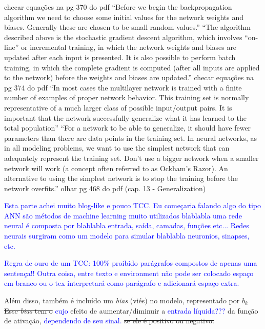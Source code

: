 \documentclass{automatextcc}
\newcommand{\pumi}[1]{\textcolor{blue}{#1}}
\begin{document}
checar equações na pg 370 do pdf
``Before we begin the backpropagation algorithm we need to choose some initial values for the network weights and biases. Generally these are chosen to be small random values.''
``The algorithm described above is the stochastic gradient descent algorithm, which involves “on-line” or incremental training, in which the network weights and biases are updated after each input is presented. It is also possible to perform batch training, in which the complete gradient is computed (after all inputs are applied to the network) before the weights and biases are updated.''
checar equações na pg 374 do pdf
``In most cases the multilayer network is trained with a finite number of examples of proper network behavior. This training set is normally representative of a much larger class of possible input/output pairs. It is important that the network successfully generalize what it has learned to the total population''
``For a network to be able to generalize, it should have fewer parameters than there are data points in the training set. In neural networks, as in all modeling problems, we want to use the simplest network that can adequately represent the training set. Don’t use a bigger network when a smaller network will work (a concept often referred to as Ockham’s Razor). An alternative to using the simplest network is to stop the training before
the network overfits.''
olhar pg 468 do pdf (cap. 13 - Generalization)



\vspace{3cm}
\pumi{Esta parte achei muito blog-like e pouco TCC. Eu começaria falando algo do tipo ANN são métodos de machine learning muito utilizados blablabla uma rede neural é composta por blablabla entrada, saída, camadas, funções etc... Redes neurais surgiram como um modelo para simular blablabla neuronios, sinapses, etc. }    


\pumi{Regra de ouro de um TCC: 100\% proibido parágrafos compostos de apenas uma sentença!! Outra coisa, entre texto e environment não pode ser colocado espaço em branco ou o tex interpretará como parágrafo e adicionará espaço extra.}

Além disso, também é incluído um \textit{bias} (viés) no modelo, representado por $b_k$ \sout{ Esse \textit{bias} tem o} \pumi{cujo} efeito de aumentar/diminuir a \pumi{entrada líquida???} da função de ativação, \pumi{dependendo de seu sinal.} \sout{se ele é positivo ou negativo.}
\end{document}
